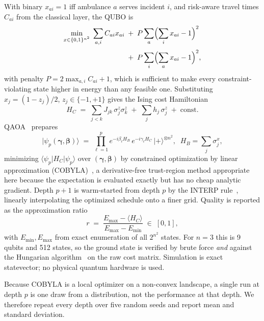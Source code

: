 \documentclass[10pt,twocolumn]{article}
\begin{document}
With binary $x_{ai}=1$ iff ambulance $a$ serves incident $i$, and risk-aware
travel times $C_{ai}$ from the classical layer, the QUBO is
\begin{equation}
\begin{aligned}
\min_{x\in\{0,1\}^{n^2}}\; \sum_{a,i} C_{ai}x_{ai}
\;&+\; P\sum_{a}\Bigl(\sum_i x_{ai}-1\Bigr)^{2} \\[2pt]
&+\; P\sum_{i}\Bigl(\sum_a x_{ai}-1\Bigr)^{2},
\end{aligned}
\label{eq:qubo}
\end{equation}
with penalty $P=2\max_{a,i}C_{ai}+1$, which is sufficient to make every
constraint-violating state higher in energy than any feasible one. Substituting
$x_j=(1-z_j)/2$, $z_j\in\{-1,+1\}$ gives the Ising cost
Hamiltonian~\citep{lucas2014}
\begin{equation}
H_C \;=\; \sum_{j<k} J_{jk}\,\sigma^z_j\sigma^z_k \;+\; \sum_j h_j\,\sigma^z_j
\;+\; \mathrm{const}.
\label{eq:ising}
\end{equation}
QAOA~\citep{farhi2014} prepares
\begin{equation}
\lvert\psi_p(\boldsymbol\gamma,\boldsymbol\beta)\rangle \;=\;
\prod_{\ell=1}^{p} e^{-i\beta_\ell H_B}\,e^{-i\gamma_\ell H_C}\,
\lvert +\rangle^{\otimes n^2},
\;\; H_B=\sum_j \sigma^x_j,
\label{eq:qaoa}
\end{equation}
minimizing $\langle\psi_p\lvert H_C\rvert\psi_p\rangle$ over
$(\boldsymbol\gamma,\boldsymbol\beta)$ by constrained optimization by linear approximation (COBYLA)~\citep{powell1994}, a
derivative-free trust-region method appropriate here because the expectation is
evaluated exactly but has no cheap analytic gradient. Depth $p+1$ is warm-started
from depth $p$ by the INTERP rule~\citep{zhou2020}, linearly interpolating the
optimized schedule onto a finer grid. Quality is reported as the approximation
ratio
\begin{equation}
r \;=\; \frac{E_{\max}-\langle H_C\rangle}{E_{\max}-E_{\min}} \;\in\; [0,1],
\label{eq:ratio}
\end{equation}
with $E_{\min},E_{\max}$ from exact enumeration of all $2^{n^2}$ states. For
$n=3$ this is 9 qubits and 512 states, so the ground state is verified by brute
force \emph{and} against the Hungarian algorithm~\citep{kuhn1955} on the raw cost
matrix. Simulation is exact statevector; no physical quantum hardware is used.

Because COBYLA is a local optimizer on a non-convex landscape, a single run at
depth $p$ is one draw from a distribution, not the performance at that
depth. We therefore repeat every depth over five random seeds and report mean and
standard deviation.
\end{document}
